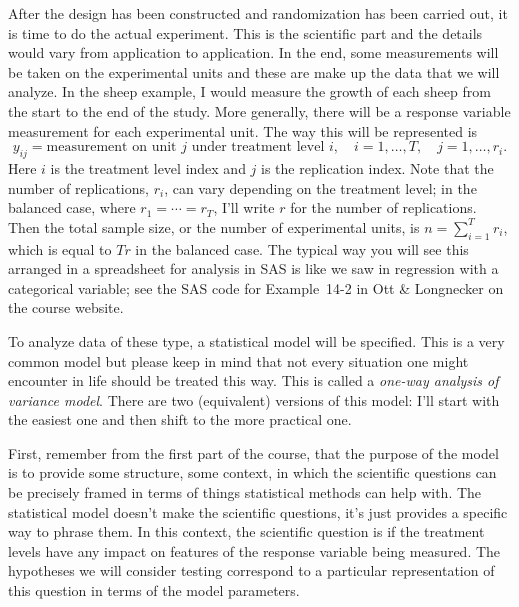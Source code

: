 \documentclass[a4paper, 12pt]{article}
\theoremstyle{plain}
\theoremstyle{definition}
\theoremstyle{remark}
\begin{document}
After the design has been constructed and randomization has been carried out, it is time to do the actual experiment.  This is the scientific part and the details would vary from application to application.  In the end, some measurements will be taken on the experimental units and these are make up the data that we will analyze.  In the sheep example, I would measure the growth of each sheep from the start to the end of the study.  More generally, there will be a response variable measurement for each experimental unit.  The way this will be represented is 
\[ y_{ij} = \text{measurement on unit $j$ under treatment level $i$}, \quad i=1,\ldots,T, \quad j=1,\ldots,r_i. \]
Here $i$ is the treatment level index and $j$ is the replication index.  Note that the number of replications, $r_i$, can vary depending on the treatment level; in the balanced case, where $r_1 = \cdots = r_T$, I'll write $r$ for the number of replications.  Then the total sample size, or the number of experimental units, is $n = \sum_{i=1}^T r_i$, which is equal to $Tr$ in the balanced case.  The typical way you will see this arranged in a spreadsheet for analysis in SAS is like we saw in regression with a categorical variable; see the SAS code for Example~14-2 in Ott \& Longnecker on the course website.  

To analyze data of these type, a statistical model will be specified.  This is a very common model but please keep in mind that not every situation one might encounter in life should be treated this way.  This is called a {\em one-way analysis of variance model}.  There are two (equivalent) versions of this model: I'll start with the easiest one and then shift to the more practical one.  

First, remember from the first part of the course, that the purpose of the model is to provide some structure, some context, in which the scientific questions can be precisely framed in terms of things statistical methods can help with.  The statistical model doesn't make the scientific questions, it's just provides a specific way to phrase them.  In this context, the scientific question is if the treatment levels have any impact on features of the response variable being measured.  The hypotheses we will consider testing correspond to a particular representation of this question in terms of the model parameters.  
\end{document}
